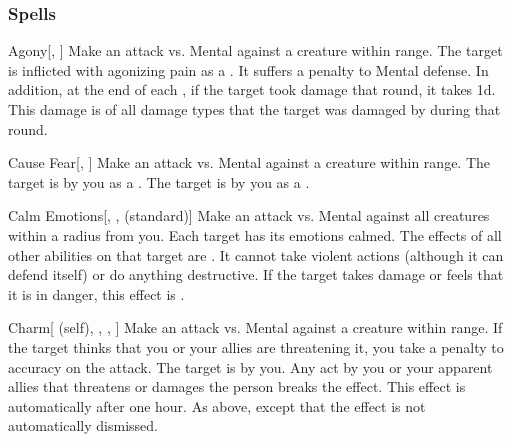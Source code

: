 \subsubsection{Spells}


\begin{ability}[\nth{1}]{Agony}[, ]
Make an attack vs. Mental against a creature within \rngmed range.
\hit The target is inflicted with agonizing pain as a .
It suffers a  penalty to Mental defense.
In addition, at the end of each , if the target took damage that round, it takes  \minus1d.
This damage is of all damage types that the target was damaged by during that round.
\end{ability}
\vspace{0.25em}



\begin{ability}[\nth{1}]{Cause Fear}[, ]
Make an attack vs. Mental against a creature within \rngmed range.
\hit The target is \frightened by you as a .
\crit The target is \panicked by you as a .
\end{ability}
\vspace{0.25em}



\begin{ability}[\nth{2}]{Calm Emotions}[, ,  (standard)]
Make an attack vs. Mental against all creatures within a \areamed radius from you.
\hit Each target has its emotions calmed.
The effects of all other  abilities on that target are .
It cannot take violent actions (although it can defend itself) or do anything destructive.
If the target takes damage or feels that it is in danger, this effect is .
\end{ability}
\vspace{0.25em}



\begin{ability}[\nth{2}]{Charm}[ (self), , , ]
Make an attack vs. Mental against a creature within \rngmed range.
If the target thinks that you or your allies are threatening it, you take a  penalty to accuracy on the attack.
\hit The target is \charmed by you.
Any act by you or your apparent allies that threatens or damages the  person breaks the effect.
This effect is automatically  after one hour.
\crit As above, except that the effect is not automatically dismissed.
\end{ability}
\vspace{0.25em}



